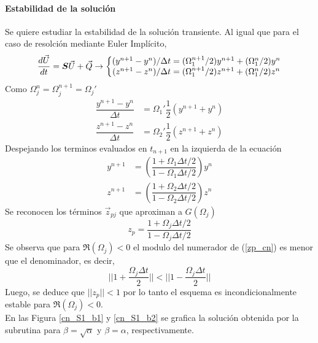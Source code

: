 \paragraph{Estabilidad de la solución} Se quiere estudiar la estabilidad de la solución transiente. Al igual que para el caso de resolción mediante Euler Implícito,
\begin{equation}
\dfrac{d \vec{U}}{d t} = \boldsymbol{S} \vec{U} + \vec{Q} \rightarrow \left\{ \begin{matrix}
(y^{n+1}-y^n)/\Delta t = (\Omega_1^{n+1}/2) y^{n+1} + (\Omega_1^n/2) y^n \\
(z^{n+1}-z^n)/\Delta t = (\Omega_1^{n+1}/2) z^{n+1} + (\Omega_1^n/2) z^n
\end{matrix} \right.
\end{equation}
Como $\Omega_j^n = \Omega_j^{n+1} = \Omega_j'$ 
\begin{align}
\dfrac{ y^{n+1} - y^n } { \Delta t } & = \Omega_1' \dfrac{1}{2} \left( y^{n+1} + y^{n} \right) \\
\dfrac{ z^{n+1} - z^n } { \Delta t } & = \Omega_2' \dfrac{1}{2} \left( z^{n+1} + z^{n} \right)
\end{align} 
Despejando los terminos evaluados en $t_{n+1}$ en la izquierda de la ecuación
\begin{align}
y^{n+1} &= \left( \dfrac{ 1 + \Omega_1 \Delta t /2 }{ 1 - \Omega_1 \Delta t / 2} \right) y^n \\
z^{n+1} &= \left( \dfrac{ 1 + \Omega_2 \Delta t / 2}{ 1 - \Omega_2 \Delta t / 2} \right) z^n
\end{align}
Se reconocen los términos $\vec{z}_{pj}$ que aproximan a $G(\Omega_j)$
\begin{equation} \label{zp_cn}
z_p = \dfrac{1+\Omega_j \Delta t / 2}{1-\Omega_j \Delta t / 2} 
\end{equation}
Se observa que para $\Re(\Omega_j)<0$ el modulo del numerador de (\ref{zp_cn}) es menor que el denominador, es decir,
\begin{equation}
|| 1+\dfrac{\Omega_j \Delta t}{ 2 } || < ||1 - \dfrac{\Omega_j \Delta t}{ 2 }||
\end{equation}
Luego, se deduce que $||z_p||<1$ por lo tanto el esquema es incondicionalmente estable para $\Re(\Omega_j)<0$. \\

En las Figura \ref{cn_S1_b1} y \ref{cn_S1_b2} se grafica la solución obtenida por la subrutina para $\beta=\sqrt{\alpha}$ y $\beta=\alpha$, respectivamente.


